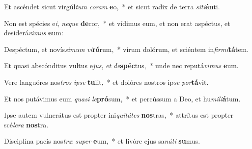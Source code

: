 \item Et ascéndet sicut virgúl\textit{tum} \textit{co}\textit{ram} \textbf{e}o,~* et sicut radix de terra \textit{si}\textit{ti}\textbf{én}ti.
\item Non est spécies e\textit{i}, \textit{ne}\textit{que} \textbf{de}cor,~* et vídimus eum, et non erat aspéctus, et desiderá\textit{vi}\textit{mus} \textbf{e}um:
\item Despéctum, et novís\textit{si}\textit{mum} \textit{vi}\textbf{ró}rum,~* virum dolórum, et sciéntem in\textit{fir}\textit{mi}\textbf{tá}tem.
\item Et quasi abscónditus vultus e\textit{jus}, \textit{et} \textit{de}\textbf{spéc}tus,~* unde nec reputá\textit{vi}\textit{mus} \textbf{e}um.
\item Vere languóres nos\textit{tros} \textit{ip}\textit{se} \textbf{tu}lit,~* et dolóres nostros ip\textit{se} \textit{por}\textbf{tá}vit.
\item Et nos putávimus eum \textit{qua}\textit{si} \textit{le}\textbf{pró}sum,~* et percússum a Deo, et hu\textit{mi}\textit{li}\textbf{á}tum.
\item Ipse autem vulnerátus est propter ini\textit{qui}\textit{tá}\textit{tes} \textbf{nos}tras,~* attrítus est propter scé\textit{le}\textit{ra} \textbf{nos}tra.
\item Disciplína pacis nos\textit{træ} \textit{su}\textit{per} \textbf{e}um,~* et livóre ejus sa\textit{ná}\textit{ti} \textbf{su}mus.
